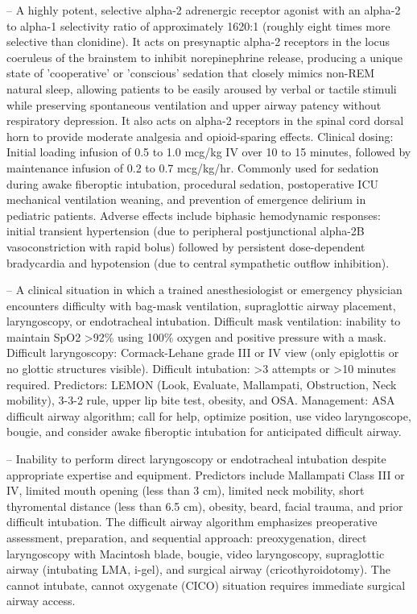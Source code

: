 -- A highly potent, selective alpha-2 adrenergic receptor agonist with an alpha-2 to alpha-1 selectivity ratio of approximately 1620:1 (roughly eight times more selective than clonidine). It acts on presynaptic alpha-2 receptors in the locus coeruleus of the brainstem to inhibit norepinephrine release, producing a unique state of 'cooperative' or 'conscious' sedation that closely mimics non-REM natural sleep, allowing patients to be easily aroused by verbal or tactile stimuli while preserving spontaneous ventilation and upper airway patency without respiratory depression. It also acts on alpha-2 receptors in the spinal cord dorsal horn to provide moderate analgesia and opioid-sparing effects. Clinical dosing: Initial loading infusion of 0.5 to 1.0 mcg/kg IV over 10 to 15 minutes, followed by maintenance infusion of 0.2 to 0.7 mcg/kg/hr. Commonly used for sedation during awake fiberoptic intubation, procedural sedation, postoperative ICU mechanical ventilation weaning, and prevention of emergence delirium in pediatric patients. Adverse effects include biphasic hemodynamic responses: initial transient hypertension (due to peripheral postjunctional alpha-2B vasoconstriction with rapid bolus) followed by persistent dose-dependent bradycardia and hypotension (due to central sympathetic outflow inhibition).

-- A clinical situation in which a trained anesthesiologist or emergency physician encounters difficulty with bag-mask ventilation, supraglottic airway placement, laryngoscopy, or endotracheal intubation. Difficult mask ventilation: inability to maintain SpO2 >92\% using 100\% oxygen and positive pressure with a mask. Difficult laryngoscopy: Cormack-Lehane grade III or IV view (only epiglottis or no glottic structures visible). Difficult intubation: >3 attempts or >10 minutes required. Predictors: LEMON (Look, Evaluate, Mallampati, Obstruction, Neck mobility), 3-3-2 rule, upper lip bite test, obesity, and OSA. Management: ASA difficult airway algorithm; call for help, optimize position, use video laryngoscope, bougie, and consider awake fiberoptic intubation for anticipated difficult airway.

-- Inability to perform direct laryngoscopy or endotracheal intubation despite appropriate expertise and equipment. Predictors include Mallampati Class III or IV, limited mouth opening (less than 3 cm), limited neck mobility, short thyromental distance (less than 6.5 cm), obesity, beard, facial trauma, and prior difficult intubation. The difficult airway algorithm emphasizes preoperative assessment, preparation, and sequential approach: preoxygenation, direct laryngoscopy with Macintosh blade, bougie, video laryngoscopy, supraglottic airway (intubating LMA, i-gel), and surgical airway (cricothyroidotomy). The cannot intubate, cannot oxygenate (CICO) situation requires immediate surgical airway access.

